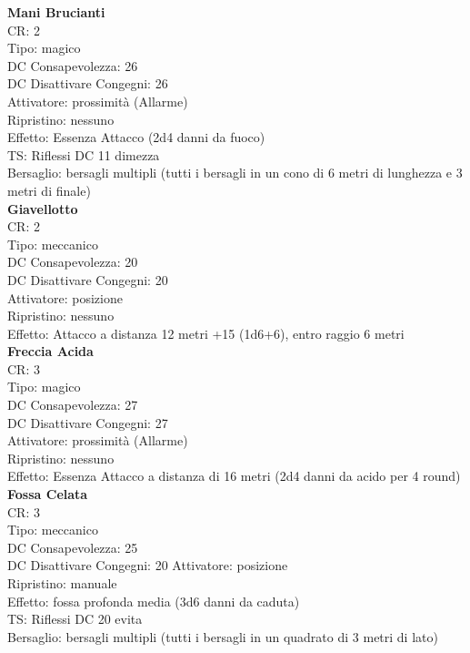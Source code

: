 \documentclass[a4paper,11pt,twoside,openany]{book}
\begin{document}
{\begin{multicols}{2}
\textbf{Mani Brucianti}\\
CR: 2 \\
Tipo: magico \\
DC Consapevolezza: 26 \\
DC Disattivare Congegni: 26 \\
Attivatore: prossimità (Allarme) \\
Ripristino: nessuno \\
Effetto: Essenza Attacco (2d4 danni da fuoco) \\
TS: Riflessi DC 11 dimezza \\
Bersaglio: bersagli multipli (tutti i bersagli in un cono di 6 metri di lunghezza e 3 metri di finale)\\

\textbf{Giavellotto}\\
CR: 2 \\
Tipo: meccanico \\
DC Consapevolezza: 20 \\
DC Disattivare Congegni: 20 \\
Attivatore: posizione \\
Ripristino: nessuno \\
Effetto: Attacco a distanza 12 metri +15 (1d6+6), entro raggio 6 metri\\

\textbf{Freccia Acida}\\
CR: 3 \\
Tipo: magico \\
DC Consapevolezza: 27 \\
DC Disattivare Congegni: 27 \\
Attivatore: prossimità (Allarme) \\
Ripristino: nessuno \\
Effetto: Essenza Attacco a distanza di 16 metri (2d4 danni da acido per 4 round)\\

\textbf{Fossa Celata}\\
CR: 3 \\
Tipo: meccanico \\
DC Consapevolezza: 25 \\
DC Disattivare Congegni: 20 
Attivatore: posizione \\
Ripristino: manuale \\
Effetto: fossa profonda media (3d6 danni da caduta) \\
TS: Riflessi DC 20 evita \\
Bersaglio: bersagli multipli (tutti i bersagli in un quadrato di 3 metri di lato)\\


\end{multicols}}
\end{document}

